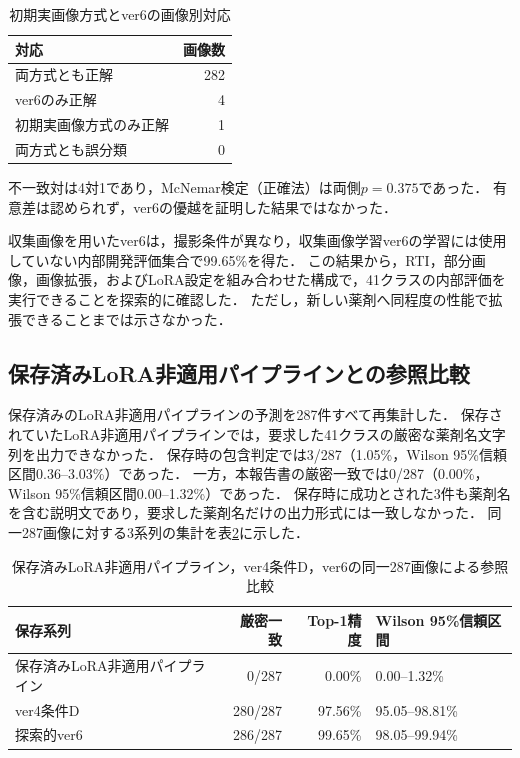 \documentclass[uplatex,dvipdfmx]{jsarticle}
\begin{document}
\begin{table}[H]
  \centering
  \caption{初期実画像方式とver6の画像別対応}
  \label{tab:paired_initial_web}
  \small
  \begin{tabular}{|l|r|}
    \hline
    対応 & 画像数 \\ \hline
    両方式とも正解 & 282 \\ \hline
    ver6のみ正解 & 4 \\ \hline
    初期実画像方式のみ正解 & 1 \\ \hline
    両方式とも誤分類 & 0 \\ \hline
  \end{tabular}
\end{table}

不一致対は4対1であり，McNemar検定（正確法）は両側$p=0.375$であった．
有意差は認められず，ver6の優越を証明した結果ではなかった．

収集画像を用いたver6は，撮影条件が異なり，収集画像学習ver6の学習には使用していない内部開発評価集合で99.65\%を得た．
この結果から，RTI，部分画像，画像拡張，およびLoRA設定を組み合わせた構成で，41クラスの内部評価を実行できることを探索的に確認した．
ただし，新しい薬剤へ同程度の性能で拡張できることまでは示さなかった．

\subsection{保存済みLoRA非適用パイプラインとの参照比較}\label{sec:qwen_baseline}

保存済みのLoRA非適用パイプラインの予測を287件すべて再集計した．
保存されていたLoRA非適用パイプラインでは，要求した41クラスの厳密な薬剤名文字列を出力できなかった．
保存時の包含判定では3/287（1.05\%，Wilson 95\%信頼区間0.36--3.03\%）であった．
一方，本報告書の厳密一致では0/287（0.00\%，Wilson 95\%信頼区間0.00--1.32\%）であった．
保存時に成功とされた3件も薬剤名を含む説明文であり，要求した薬剤名だけの出力形式には一致しなかった．
同一287画像に対する3系列の集計を表\ref{tab:qwen_baseline}に示した．

\begin{table}[H]
  \centering
  \caption{保存済みLoRA非適用パイプライン，ver4条件D，ver6の同一287画像による参照比較}
  \label{tab:qwen_baseline}
  \small
  \begin{tabular}{|p{4.6cm}|r|r|p{3.1cm}|}
    \hline
    保存系列 & 厳密一致 & Top-1精度 & Wilson 95\%信頼区間 \\ \hline
    保存済みLoRA非適用パイプライン & 0/287 & 0.00\% & 0.00--1.32\% \\ \hline
    ver4条件D & 280/287 & 97.56\% & 95.05--98.81\% \\ \hline
    探索的ver6 & 286/287 & 99.65\% & 98.05--99.94\% \\ \hline
  \end{tabular}
\end{table}
\end{document}
